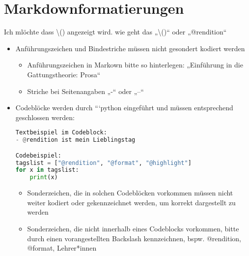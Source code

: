\documentclass[
          a4paper,
        ]{article}
\providecommand{\tightlist}{%
  \setlength{\itemsep}{0pt}\setlength{\parskip}{0pt}}
\begin{document}
\pagestyle{plain}


\maketitle














\pagestyle{page}

\renewcommand{\arraystretch}{3}  %

\section{Markdownformatierungen}\label{markdownformatierungen}

Ich mlöchte dass
\textbackslash{}()
angezeigt wird. wie geht das
„\textbackslash{}()`` oder
„@rendition``

\begin{itemize}
\item
  Anführungszeichen und Bindestriche müssen nicht gesondert kodiert
  werden

  \begin{itemize}
  \tightlist
  \item
    Anführungszeichen in Markown bitte so hinterlegen: „Einführung in
    die Gattungstheorie: Prosa``
  \item
    Striche bei Seitenangaben „-`` oder „--``
  \end{itemize}
\item
  Codeblöcke werden durch ```python eingeführt und müssen entsprechend
  geschlossen werden:

\begin{lstlisting}[language=Python]
Textbeispiel im Codeblock: 
- @rendition ist mein Lieblingstag

Codebeispiel:
tagslist = ["@rendition", "@format", "@highlight"]
for x in tagslist:
    print(x)
\end{lstlisting}

  \begin{itemize}
  \tightlist
  \item
    Sonderzeichen, die in solchen Codeblöcken vorkommen müssen nicht
    weiter kodiert oder gekennzeichnet werden, um korrekt dargestellt zu
    werden
  \item
    Sonderzeichen, die nicht innerhalb eines Codeblocks vorkommen, bitte
    durch einen vorangestellten Backslash kennzeichnen, bspw.
    @rendition, @format, Lehrer*innen
  \end{itemize}
\end{itemize}
\end{document}
